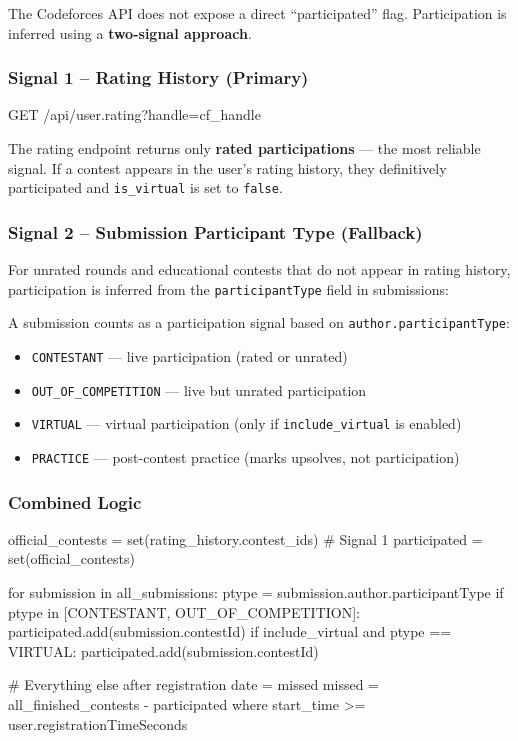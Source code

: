 \documentclass[11pt, a4paper]{article}
\begin{document}
The Codeforces API does not expose a direct ``participated'' flag.
Participation is inferred using a \textbf{two-signal approach}.

\subsubsection{Signal 1 -- Rating History (Primary)}

\begin{codebox}
GET /api/user.rating?handle={cf_handle}
\end{codebox}

The rating endpoint returns only \textbf{rated participations} --- the most
reliable signal. If a contest appears in the user's rating history, they
definitively participated and \texttt{is\_virtual} is set to \texttt{false}.

\subsubsection{Signal 2 -- Submission Participant Type (Fallback)}

For unrated rounds and educational contests that do not appear in rating
history, participation is inferred from the \texttt{participantType} field
in submissions:

\begin{infobox}
  A submission counts as a participation signal based on
  \texttt{author.participantType}:
  \begin{itemize}
    \item \texttt{CONTESTANT} --- live participation (rated or unrated)
    \item \texttt{OUT\_OF\_COMPETITION} --- live but unrated participation
    \item \texttt{VIRTUAL} --- virtual participation (only if \texttt{include\_virtual} is enabled)
    \item \texttt{PRACTICE} --- post-contest practice (marks upsolves, not participation)
  \end{itemize}
\end{infobox}

\subsubsection{Combined Logic}

\begin{codebox}
official_contests = set(rating_history.contest_ids)  # Signal 1
participated = set(official_contests)

for submission in all_submissions:
    ptype = submission.author.participantType
    if ptype in [CONTESTANT, OUT_OF_COMPETITION]:
        participated.add(submission.contestId)
    if include_virtual and ptype == VIRTUAL:
        participated.add(submission.contestId)

# Everything else after registration date = missed
missed = all_finished_contests - participated
    where start_time >= user.registrationTimeSeconds
\end{codebox}
\end{document}
